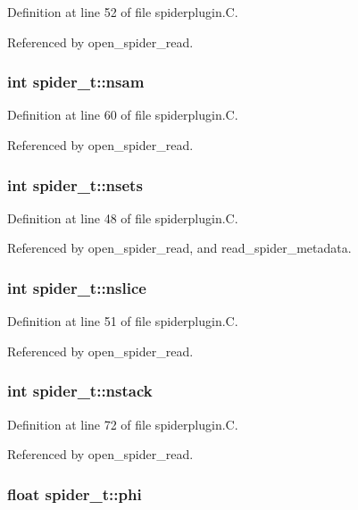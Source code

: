 Definition at line 52 of file spiderplugin.C.

Referenced by open\_\-spider\_\-read.
\subsubsection{\setlength{\rightskip}{0pt plus 5cm}int spider\_\-t::nsam}\label{structspider__t_m13}




Definition at line 60 of file spiderplugin.C.

Referenced by open\_\-spider\_\-read.
\subsubsection{\setlength{\rightskip}{0pt plus 5cm}int spider\_\-t::nsets}\label{structspider__t_m1}




Definition at line 48 of file spiderplugin.C.

Referenced by open\_\-spider\_\-read, and read\_\-spider\_\-metadata.
\subsubsection{\setlength{\rightskip}{0pt plus 5cm}int spider\_\-t::nslice}\label{structspider__t_m4}




Definition at line 51 of file spiderplugin.C.

Referenced by open\_\-spider\_\-read.
\subsubsection{\setlength{\rightskip}{0pt plus 5cm}int spider\_\-t::nstack}\label{structspider__t_m25}




Definition at line 72 of file spiderplugin.C.

Referenced by open\_\-spider\_\-read.
\subsubsection{\setlength{\rightskip}{0pt plus 5cm}float spider\_\-t::phi}\label{structspider__t_m16}




